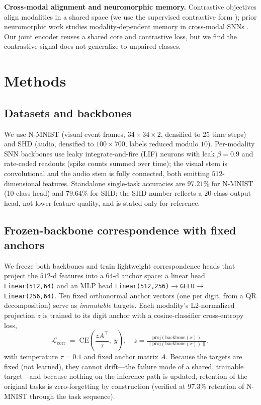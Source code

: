 \documentclass[conference]{IEEEtran}
\begin{document}
\textbf{Cross-modal alignment and neuromorphic memory.} Contrastive
objectives align modalities in a shared space (we use the supervised
contrastive form \cite{supcon}); prior neuromorphic work studies
modality-dependent memory in cross-modal SNNs \cite{paper1}. Our joint
encoder reuses a shared core and contrastive loss, but we find the
contrastive signal does not generalize to unpaired classes.

\section{Methods}\label{sec:methods}
\subsection{Datasets and backbones}
We use N-MNIST \cite{nmnist} (visual event frames, $34{\times}34{\times}2$,
densified to $25$ time steps) and SHD \cite{shd} (audio, densified to
$100{\times}700$, labels reduced modulo $10$). Per-modality SNN backbones
use leaky integrate-and-fire (LIF) neurons with leak $\beta{=}0.9$ and
rate-coded readouts (spike counts summed over time); the visual stem is
convolutional and the audio stem is fully connected, both emitting
$512$-dimensional features. Standalone single-task accuracies are
$97.21\%$ for N-MNIST (10-class head) and $79.64\%$ for SHD; the SHD number
reflects a $20$-class output head, not lower feature quality, and is stated
only for reference.

\subsection{Frozen-backbone correspondence with fixed anchors}
\label{sec:method:corr}
We freeze both backbones and train lightweight correspondence heads that
project the $512$-d features into a $64$-d anchor space: a linear head
\texttt{Linear(512,64)} and an MLP head
\texttt{Linear(512,256)$\to$GELU$\to$Linear(256,64)}. Ten fixed orthonormal
anchor vectors (one per digit, from a QR decomposition) serve as
\emph{immutable} targets. Each modality's L2-normalized projection $z$ is
trained to its digit anchor with a cosine-classifier cross-entropy loss,
\begin{equation}
\mathcal{L}_{\mathrm{corr}} \;=\; \mathrm{CE}\!\left( \frac{z A^{\!\top}}{\tau},\; y \right),
\quad z = \tfrac{\mathrm{proj}(\mathrm{backbone}(x))}{\|\mathrm{proj}(\mathrm{backbone}(x))\|},
\label{eq:loss}
\end{equation}
with temperature $\tau{=}0.1$ and fixed anchor matrix $A$. Because the
targets are fixed (not learned), they cannot drift---the failure mode of a
shared, trainable target---and because nothing on the inference path is
updated, retention of the original tasks is zero-forgetting by construction
(verified at $97.3\%$ retention of N-MNIST through the task sequence).
\end{document}
